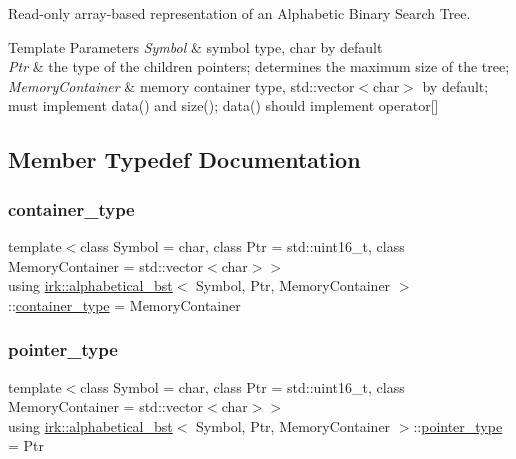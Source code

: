 Read-\/only array-\/based representation of an Alphabetic Binary Search Tree. 


\begin{DoxyTemplParams}{Template Parameters}
{\em Symbol} & symbol type, {\ttfamily char} by default \\
\hline
{\em Ptr} & the type of the children pointers; determines the maximum size of the tree; \\
\hline
{\em Memory\+Container} & memory container type, std\+::vector$<$char$>$ by default; must implement data() and size(); data() should implement operator\mbox{[}\mbox{]} \\
\hline
\end{DoxyTemplParams}


\subsection{Member Typedef Documentation}
\mbox{\label{classirk_1_1alphabetical__bst_aeed9efc6a48ff6d504a608e06223f386}} 
\subsubsection{\texorpdfstring{container\+\_\+type}{container\_type}}
{\footnotesize\ttfamily template$<$class Symbol = char, class Ptr = std\+::uint16\+\_\+t, class Memory\+Container = std\+::vector$<$char$>$$>$ \\
using \mbox{\hyperlink{classirk_1_1alphabetical__bst}{irk\+::alphabetical\+\_\+bst}}$<$ Symbol, Ptr, Memory\+Container $>$\+::\mbox{\hyperlink{classirk_1_1alphabetical__bst_aeed9efc6a48ff6d504a608e06223f386}{container\+\_\+type}} =  Memory\+Container}

\mbox{\label{classirk_1_1alphabetical__bst_ae689c05ab96a71769e24908d5c73765c}} 
\subsubsection{\texorpdfstring{pointer\+\_\+type}{pointer\_type}}
{\footnotesize\ttfamily template$<$class Symbol = char, class Ptr = std\+::uint16\+\_\+t, class Memory\+Container = std\+::vector$<$char$>$$>$ \\
using \mbox{\hyperlink{classirk_1_1alphabetical__bst}{irk\+::alphabetical\+\_\+bst}}$<$ Symbol, Ptr, Memory\+Container $>$\+::\mbox{\hyperlink{classirk_1_1alphabetical__bst_ae689c05ab96a71769e24908d5c73765c}{pointer\+\_\+type}} =  Ptr}

